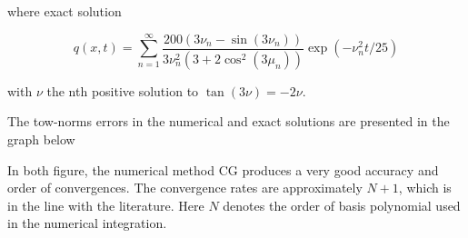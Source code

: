 \documentclass[11pt,a4paper]{article}
\begin{document}
	where exact solution 
	
	$$ q(x,t) = \sum_{n=1}^{\infty}\dfrac{200(3\nu_n-\sin(3\nu_n))}{3\nu_n^2(3+2\cos^2(3\mu_n))}\exp(-\nu_n^2t/25)$$
	
	with $\nu$ the nth positive solution to $\tan(3\nu) = -2\nu.$
	
	The tow-norms errors in the numerical and exact solutions are presented in the graph below
	
	
	\begin{figure}[H]
		
		\centering
		\label{fig:4a}
		\label{fig:4b}
		
		\label{fig:4}
	\end{figure}
	
	In both figure, the numerical method CG produces a very good accuracy and order of convergences. The convergence rates are approximately $N+1$, which is in the line with the literature. Here $N$ denotes the order of basis polynomial used in the numerical integration.\\
	
\end{document}
